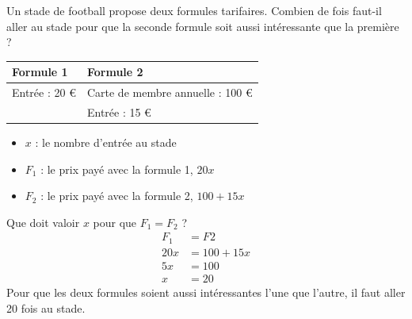 \documentclass[a4paper,fontsize=12pt, parskip=half]{scrartcl}
\begin{document}
\begin{exercise}

    Un stade de football propose deux formules tarifaires. Combien de fois
    faut-il aller au stade pour que la seconde formule soit aussi intéressante
    que la première ?
    \begin{center}
        \begin{tabularx}{.9\linewidth}{YY}
            \toprule
            \textbf{Formule 1} & \textbf{Formule 2}               \\
            \midrule
            Entrée : 20 €      & Carte de membre annuelle : 100 € \\
                               & Entrée : 15 €                    \\
            \bottomrule
        \end{tabularx}
    \end{center}
\end{exercise}
\begin{solution}
    \begin{itemize}[label=\faAngleRight]
        \item $x$ : le nombre d'entrée au stade
        \item $F_1$ : le prix payé avec la formule 1, $20x$
        \item $F_2$ : le prix payé avec la formule 2, $100 + 15x$
    \end{itemize}
    Que doit valoir $x$ pour que $F_1=F_2$ ?
    \begin{align*}
        F_1 & = F2      \\
        20x & = 100+15x \\
        5x  & = 100     \\
        x   & = 20
    \end{align*}
    Pour que les deux formules soient aussi intéressantes l'une que l'autre,
    il faut aller 20 fois au stade.
\end{solution}
\end{document}
